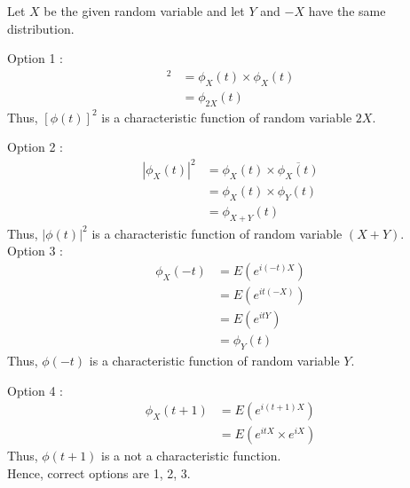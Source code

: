 \documentclass[journal,12pt,twocolumn]{IEEEtran}
\begin{document}
Let $X$ be the given random variable and let $Y$  and $-X$ have the same distribution.

Option 1 :\begin{align*} [\phi_X(t)]^2 &= \phi_X(t)\times\phi_X(t) \\
                &= \phi_{2X}(t)
\end{align*}
Thus, $[\phi(t)]^2$ is a characteristic function of random variable $2X$.

Option 2 :\begin{align*} |\phi_X(t)|^2 &= \phi_X(t)\times\overline{\phi_X(t)} \\
                &= \phi_X(t)\times\phi_Y(t) \\
                &= \phi_{X+Y}(t)
\end{align*}
Thus, $|\phi(t)|^2$ is a characteristic function of random variable $(X+Y)$.\\

Option 3 :\begin{align*} \phi_X(-t) &= E(e^{i(-t)X}) \\
                &= E(e^{it(-X)}) \\
                &= E(e^{itY})\\
                &= \phi_Y(t)
\end{align*}
Thus, $\phi(-t)$ is a characteristic function of random variable $Y$.

Option 4 :\begin{align*} \phi_X(t+1) &= E(e^{i(t+1)X}) \\
&= E(e^{itX}\times e^{iX}) 
\end{align*}
Thus, $\phi(t+1)$ is a not a characteristic function.\\

Hence, correct options are 1, 2, 3.
\end{document}
